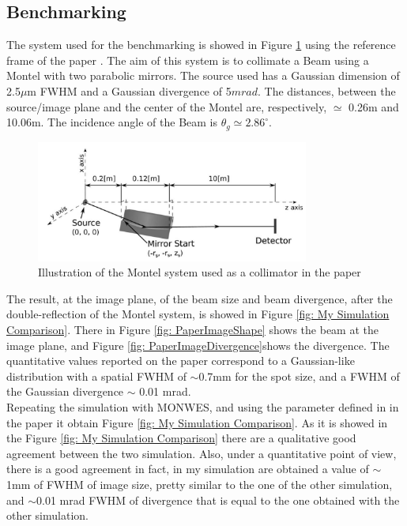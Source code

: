 \subsection{Benchmarking} 
The system used for the benchmarking is showed in Figure \ref{fig: PaperMontelSystem} using the reference frame of the paper \cite{resta2015nested}. The aim of this system is to collimate a Beam using a Montel with two parabolic mirrors. The source used has a Gaussian dimension of 2.5$\mu $m FWHM and a Gaussian divergence of 5$mrad $. The distances, between the source/image plane and the center of the Montel are, respectively,  $\simeq $ 0.26m and 10.06m. The incidence angle of the Beam is $\theta_g \simeq 2.86^{\circ} $.
%
\begin{figure}[]
	\centering
		\includegraphics[width=0.8\textwidth]{Immagini/Chapter4/PaperMontelSystem}
		\caption{Illustration of the Montel system used as a collimator in the paper \cite{resta2015nested}}
		\label{fig: PaperMontelSystem}
\end{figure}
%
The result, at the image plane, of the beam size and beam divergence, after the double-reflection of the Montel system, is showed in Figure \ref{fig: My Simulation Comparison}. There in Figure \ref{fig: PaperImageShape} shows the beam at the image plane, and  Figure \ref{fig: PaperImageDivergence}shows the divergence. The quantitative values reported on the paper correspond to a Gaussian-like distribution with a spatial FWHM of $\sim $0.7mm for the spot size, and a FWHM of the Gaussian divergence $\sim $ 0.01 mrad.
\\
Repeating the simulation with MONWES, and using the parameter defined in  in the paper \cite{resta2015nested} it obtain Figure \ref{fig: My Simulation Comparison}. As it is showed in the Figure \ref{fig: My Simulation Comparison} there are a qualitative good agreement between the two simulation. Also, under a quantitative point of view, there is a good agreement in fact, in my simulation are obtained a value of $\sim $1mm of FWHM of image size, pretty similar to the one of the other simulation, and $\sim $0.01 mrad FWHM of divergence that is equal to the one obtained with the other simulation.
